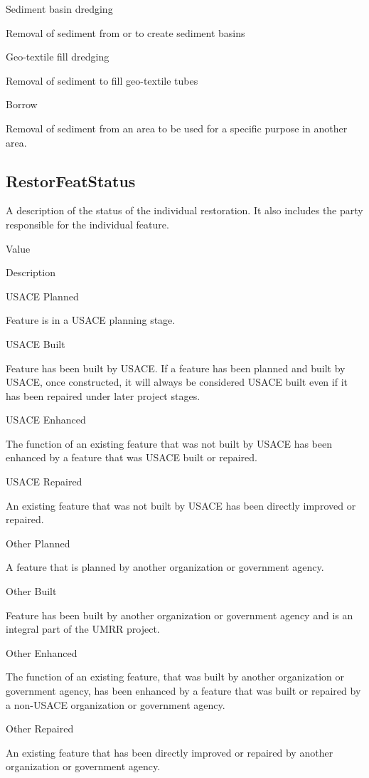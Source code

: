 \documentclass[
  letterpaper,
  DIV=11,
  numbers=noendperiod]{scrreprt}
\begin{document}
Sediment basin dredging

Removal of sediment from or to create sediment basins

Geo-textile fill dredging

Removal of sediment to fill geo-textile tubes

Borrow

Removal of sediment from an area to be used for a specific purpose in
another area.

\subsection{RestorFeatStatus}\label{restorfeatstatus}

A description of the status of the individual restoration. It also
includes the party responsible for the individual feature.

Value

Description

USACE Planned

Feature is in a USACE planning stage.

USACE Built

Feature has been built by USACE. If a feature has been planned and built
by USACE, once constructed, it will always be considered USACE built
even if it has been repaired under later project stages.

USACE Enhanced

The function of an existing feature that was not built by USACE has been
enhanced by a feature that was USACE built or repaired.

USACE Repaired

An existing feature that was not built by USACE has been directly
improved or repaired.

Other Planned

A feature that is planned by another organization or government agency.

Other Built

Feature has been built by another organization or government agency and
is an integral part of the UMRR project.

Other Enhanced

The function of an existing feature, that was built by another
organization or government agency, has been enhanced by a feature that
was built or repaired by a non-USACE organization or government agency.

Other Repaired

An existing feature that has been directly improved or repaired by
another organization or government agency.
\end{document}
